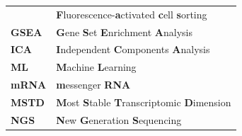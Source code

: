 \documentclass[12pt,]{book}
\theoremstyle{definition}
\theoremstyle{definition}
\theoremstyle{definition}
\theoremstyle{remark}
\begin{document}
\begin{longtable}[]{@{}ll@{}}
\begin{minipage}[t]{0.14\columnwidth}
\end{minipage} & \begin{minipage}[t]{0.80\columnwidth}\raggedright
\textbf{F}luorescence-\textbf{a}ctivated \textbf{c}ell
\textbf{s}orting\strut
\end{minipage}\tabularnewline
\begin{minipage}[t]{0.14\columnwidth}\raggedright
\textbf{GSEA}\strut
\end{minipage} & \begin{minipage}[t]{0.80\columnwidth}\raggedright
\textbf{G}ene \textbf{S}et \textbf{E}nrichment \textbf{A}nalysis\strut
\end{minipage}\tabularnewline
\begin{minipage}[t]{0.14\columnwidth}\raggedright
\textbf{ICA}\strut
\end{minipage} & \begin{minipage}[t]{0.80\columnwidth}\raggedright
\textbf{I}ndependent \textbf{C}omponents \textbf{A}nalysis\strut
\end{minipage}\tabularnewline
\begin{minipage}[t]{0.14\columnwidth}\raggedright
\textbf{ML}\strut
\end{minipage} & \begin{minipage}[t]{0.80\columnwidth}\raggedright
\textbf{M}achine \textbf{L}earning\strut
\end{minipage}\tabularnewline
\begin{minipage}[t]{0.14\columnwidth}\raggedright
\textbf{mRNA}\strut
\end{minipage} & \begin{minipage}[t]{0.80\columnwidth}\raggedright
\textbf{m}essenger \textbf{RNA}\strut
\end{minipage}\tabularnewline
\begin{minipage}[t]{0.14\columnwidth}\raggedright
\textbf{MSTD}\strut
\end{minipage} & \begin{minipage}[t]{0.80\columnwidth}\raggedright
\textbf{M}ost \textbf{S}table \textbf{T}ranscriptomic
\textbf{D}imension\strut
\end{minipage}\tabularnewline
\begin{minipage}[t]{0.14\columnwidth}\raggedright
\textbf{NGS}\strut
\end{minipage} & \begin{minipage}[t]{0.80\columnwidth}\raggedright
\textbf{N}ew \textbf{G}eneration \textbf{S}equencing\strut
\end{minipage}\tabularnewline

\end{longtable}
\end{document}
